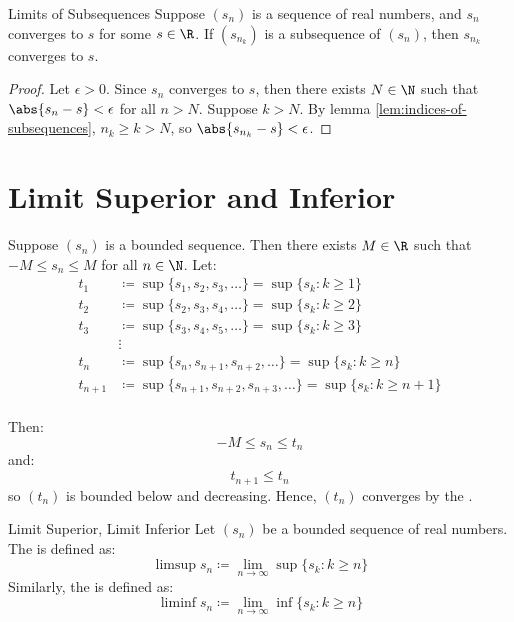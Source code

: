 \begin{thmbox}{Limits of Subsequences}{}
    Suppose $(s_n)$ is a sequence of real numbers, and $s_n$ converges to $s$ for some $s \in \R$. If $(s_{n_k})$ is a subsequence of $(s_n)$, then $s_{n_k}$ converges to $s$.
    \tcblower
    \begin{proof}
        Let $\epsilon > 0$. Since $s_n$ converges to $s$, then there exists $N \in \N$ such that $\abs{s_n - s} < \epsilon$ for all $n > N$. Suppose $k > N$. By lemma \ref{lem:indices-of-subsequences}, $n_k \geq k > N$, so $\abs{s_{n_k} - s} < \epsilon$.
    \end{proof}
\end{thmbox}

\section{Limit Superior and Inferior}

Suppose $(s_n)$ is a bounded sequence. Then there exists $M \in \R$ such that $-M \leq s_n \leq M$ for all $n \in \N$. Let:
\begin{align*}
    t_1 &\coloneq \sup\{s_1, s_2, s_3, \ldots\} = \sup\{ s_k : k \geq 1 \} \\
    t_2 &\coloneq \sup\{s_2, s_3, s_4, \ldots\} = \sup\{ s_k : k \geq 2\} \\
    t_3 &\coloneq \sup\{s_3, s_4, s_5, \ldots\} = \sup\{ s_k : k \geq 3\} \\
    &\vdots \\
    t_n &\coloneq \sup\{s_n, s_{n+1}, s_{n+2}, \ldots\} = \sup\{s_k : k \geq n\} \\
    t_{n+1} &\coloneq \sup\{s_{n+1}, s_{n+2}, s_{n+3}, \ldots\} = \sup\{s_k : k \geq n + 1\} \\
\end{align*}

Then:
\[ -M \leq s_n \leq t_n \]
and:
\[ t_{n+1} \leq t_n \]
so $(t_n)$ is bounded below and decreasing. Hence, $(t_n)$ converges by the .

\begin{dfnbox}{Limit Superior, Limit Inferior}{}
    Let $(s_n)$ be a bounded sequence of real numbers. The  is defined as:
    \[ \limsup s_n \coloneq \lim_{n \to \infty} \sup\{s_k : k \geq n \} \]
    Similarly, the  is defined as:
    \[ \liminf s_n \coloneq \lim_{n \to \infty} \inf\{s_k : k \geq n \} \]
\end{dfnbox}

